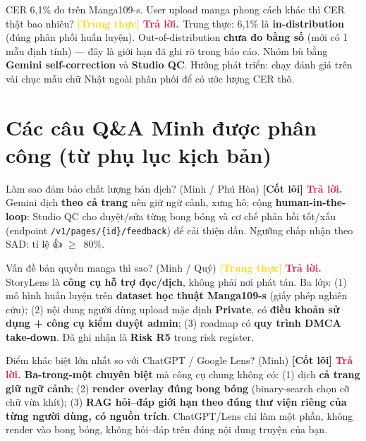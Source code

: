 \documentclass[11pt]{article}
\newcommand{\gte}{\ensuremath{\geq}}
\newcommand{\code}[1]{\texttt{\small #1}}
\newcommand{\tagCore}{\textcolor{steel}{\footnotesize\textbf{[Cốt lõi]}}}
\newcommand{\tagHonest}{\textcolor{gold}{\footnotesize\textbf{[Trung thực]}}}
\newcommand{\A}{\textbf{\textcolor{crimson}{Trả lời. }}}
\begin{document}
\begin{qa}{CER 6,1\% đo trên Manga109-s. User upload manga phong cách khác thì CER thật bao nhiêu? \tagHonest}
\A Trung thực: 6,1\% là \textbf{in-distribution} (đúng phân phối huấn luyện). Out-of-distribution \textbf{chưa đo bằng số} (mới có 1 mẫu định tính) --- đây là giới hạn đã ghi rõ trong báo cáo. Nhóm bù bằng \textbf{Gemini self-correction} và \textbf{Studio QC}. Hướng phát triển: chạy đánh giá trên vài chục mẫu chữ Nhật ngoài phân phối để có ước lượng CER thô.
\end{qa}

\section{Các câu Q\&A Minh được phân công (từ phụ lục kịch bản)}

\begin{qa}{Làm sao đảm bảo chất lượng bản dịch? (Minh / Phú Hòa) \tagCore}
\A Gemini dịch \textbf{theo cả trang} nên giữ ngữ cảnh, xưng hô; cộng \textbf{human-in-the-loop}: Studio QC cho duyệt/sửa từng bong bóng và cơ chế phản hồi tốt/xấu (endpoint \code{/v1/pages/\{id\}/feedback}) để cải thiện dần. Ngưỡng chấp nhận theo SAD: tỉ lệ 👍 \gte\ 80\%.
\end{qa}

\begin{qa}{Vấn đề bản quyền manga thì sao? (Minh / Quý) \tagHonest}
\A StoryLens là \textbf{công cụ hỗ trợ đọc/dịch}, không phải nơi phát tán. Ba lớp: (1) mô hình huấn luyện trên \textbf{dataset học thuật Manga109-s} (giấy phép nghiên cứu); (2) nội dung người dùng upload mặc định \textbf{Private}, có \textbf{điều khoản sử dụng + công cụ kiểm duyệt admin}; (3) roadmap có \textbf{quy trình DMCA take-down}. Đã ghi nhận là \textbf{Risk R5} trong risk register.
\end{qa}

\begin{qa}{Điểm khác biệt lớn nhất so với ChatGPT / Google Lens? (Minh) \tagCore}
\A \textbf{Ba-trong-một chuyên biệt} mà công cụ chung không có: (1) dịch \textbf{cả trang giữ ngữ cảnh}; (2) \textbf{render overlay đúng bong bóng} (binary-search chọn cỡ chữ vừa khít); (3) \textbf{RAG hỏi--đáp giới hạn theo đúng thư viện riêng của từng người dùng, có nguồn trích}. ChatGPT/Lens chỉ làm một phần, không render vào bong bóng, không hỏi--đáp trên đúng nội dung truyện của bạn.
\end{qa}
\end{document}
